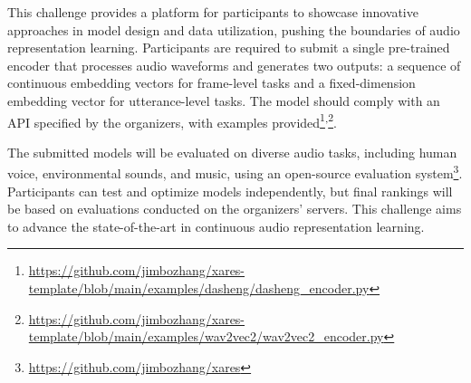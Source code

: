 \documentclass{article}
\begin{document}
This challenge provides a platform for participants to showcase innovative approaches in model design and data utilization, pushing the boundaries of audio representation learning. Participants are required to submit a single pre-trained encoder that processes audio waveforms and generates two outputs: a sequence of continuous embedding vectors for frame-level tasks and a fixed-dimension embedding vector for utterance-level tasks. The model should comply with an API specified by the organizers, with examples provided\footnote{\url{https://github.com/jimbozhang/xares-template/blob/main/examples/dasheng/dasheng_encoder.py}}\textsuperscript{,}\footnote{\url{https://github.com/jimbozhang/xares-template/blob/main/examples/wav2vec2/wav2vec2_encoder.py}}.

The submitted models will be evaluated on diverse audio tasks, including human voice, environmental sounds, and music, using an open-source evaluation system\footnote{\url{https://github.com/jimbozhang/xares}}. Participants can test and optimize models independently, but final rankings will be based on evaluations conducted on the organizers’ servers. This challenge aims to advance the state-of-the-art in continuous audio representation learning.
\end{document}
